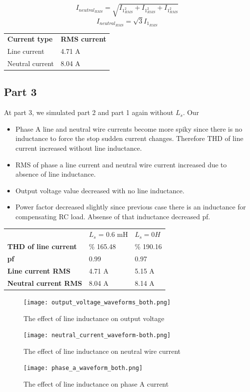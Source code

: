 \documentclass[fleqn, a4paper]{report}
\begin{document}
$$I_{neutral_{RMS}}= \sqrt{I_1_{RMS}^2+I_1_{RMS}^2+I_1_{RMS}^2}$$
$$I_{neutral_{RMS}}=\sqrt{3}I_1_{RMS}$$
\begin{table}[H]
\centering
\begin{tabular}{ll}
\textbf{Current type} & \textbf{RMS current} \\
Line current          & 4.71 A              \\
Neutral current       & 8.04 A              
\end{tabular}
\end{table}
\subsection*{Part 3}
At part 3, we simulated part 2 and part 1 again without $L_s$. Our 
\begin{itemize}
  \item Phase A line and neutral wire currents become more spiky since there is no inductance to force the stop sudden current changes. Therefore THD of line current increased without line inductance. 
  \item RMS of phase a line current and neutral wire current increased due to absence of line inductance.
  \item Output voltage value decreased with no line inductance. 
  \item Power factor decreased slightly since previous case there is an inductance for compensating RC load. Absense of that inductance decreased pf. 
\end{itemize}
\begin{table}[H]
\centering
\begin{tabular}{lll}
\textbf{}                    & $L_s$ = 0.6 mH & $L_s = 0 H$ \\
\textbf{THD of line current} & \% 165.48               & \% 190.16            \\
\textbf{pf}                  & 0.99                    & 0.97                 \\
\textbf{Line current RMS}    & 4.71 A                  & 5.15 A               \\
\textbf{Neutral current RMS} & 8.04 A                  & 8.14 A              
\end{tabular}
\end{table}

\begin{figure}[H]
  \texttt{[image: output\_voltage\_waveforms\_both.png]}
  \caption{The effect of line inductance on output voltage}
  \label{fig:simulink3}
\end{figure}
\begin{figure}[H]
  \texttt{[image: neutral\_current\_waveform-both.png]}
  \caption{The effect of line inductance on neutral wire current}
  \label{fig:simulink3}
\end{figure}
\begin{figure}[H]
  \texttt{[image: phase\_a\_waveform\_both.png]}
  \caption{The effect of line inductance on phase A current}
  \label{fig:simulink3}
\end{figure}
\end{document}
